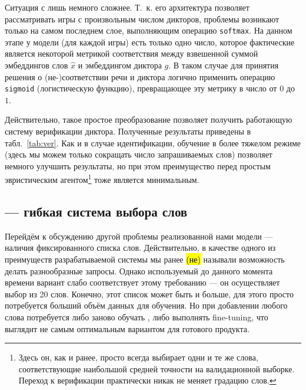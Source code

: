 Ситуация с \guesser{} лишь немного сложнее. Т.~к. его архитектура позволяет
рассматривать игры с произвольным числом дикторов, проблемы возникают только на
самом последнем слое, выполняющим операцию \texttt{softmax}. На данном этапе у
модели (для каждой игры) есть только одно число, которое фактические является
некоторой метрикой соответствия между взвешенной суммой эмбеддингов слов
$\hat{x}$ и эмбеддингом диктора $g$. В таком случае для принятия решения о
(не-)соответствии речи и диктора логично применить операцию \texttt{sigmoid}
(логистическую функцию), превращающее эту метрику в число от $0$ до $1$.

Действительно, такое простое преобразование позволяет получить работающую
систему верификации диктора. Полученные результаты приведены в
табл.~\ref{tab:ver}. Как и в случае идентификации, обучение в более тяжелом
режиме (здесь мы можем только сокращать число запрашиваемых слов) позволяет
немного улучшить результаты, но при этом преимущество перед простым эвристическим
агентом\footnote{
    Здесь он, как и ранее, просто всегда выбирает одни и те же слова,
    соответствующие наибольшой средней точности на валидационной выборке.
    Переход к верификации практически никак не меняет градацию слов.
} тоже является минимальным.

\subsection{\cbenquirer{} --- гибкая система выбора слов}\label{ssec:codebook}

Перейдём к обсуждению другой проблемы реализованной нами модели --- наличия
фиксированного списка слов. Действительно, в качестве одного из преимуществ
разрабатываемой системы мы ранее \hl{(не)} называли возможность делать
разнообразные запросы. Однако используемый до данного момента времени вариант
\enquirer{} слабо соответствует этому требованию --- он осуществляет выбор из
20 слов. Конечно, этот список может быть и больше, для этого просто потребуется
больший объём данных для обучения. Но при добавлении любого слова потребуется
либо заново обучать \enquirer{}, либо выполнять fine-tuning, что выглядит не
самым оптимальным вариантом для готового продукта.

